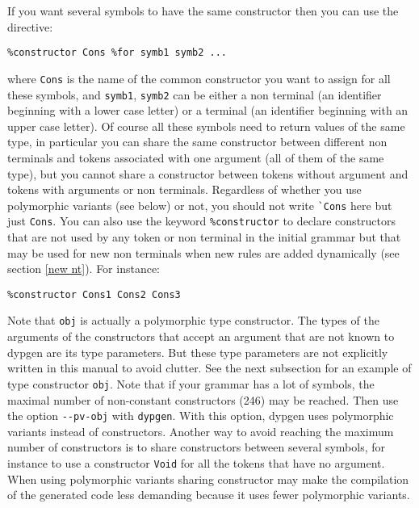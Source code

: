\documentclass[12pt]{article}
\begin{document}
{If you want several symbols to have the same constructor then you can use the directive:
\begin{verbatim}
%constructor Cons %for symb1 symb2 ...
\end{verbatim}
where \verb|Cons| is the name of the common constructor you want to assign for all these symbols, and \verb|symb1|, \verb|symb2| can be either a non terminal (an identifier beginning with a lower case letter) or a terminal (an identifier beginning with an upper case letter). Of course all these symbols need to return values of the same type, in particular you can share the same constructor between different non terminals and tokens associated with one argument (all of them of the same type), but you cannot share a constructor between tokens without argument and tokens with arguments or non terminals. Regardless of whether you use polymorphic variants (see below) or not, you should not write \verb|`Cons| here but just \verb|Cons|. You can also use the keyword \verb|%constructor| to declare constructors that are not used by any token or non terminal in the initial grammar but that may be used for new non terminals when new rules are added dynamically (see section \ref{new nt}). For instance:
\begin{verbatim}
%constructor Cons1 Cons2 Cons3
\end{verbatim}

Note that \texttt{obj} is actually a polymorphic type constructor. The types of the arguments of the constructors that accept an argument that are not known to dypgen are its type parameters. But these type parameters are not explicitly written in this manual to avoid clutter. See the next subsection for an example of type constructor \verb|obj|. Note that if your grammar has a lot of symbols, the maximal number of non-constant constructors (246) may be reached. Then use the option \verb|--pv-obj| with \verb|dypgen|. With this option, dypgen uses polymorphic variants instead of constructors. Another way to avoid reaching the maximum number of constructors is to share constructors between several symbols, for instance to use a constructor \verb|Void| for all the tokens that have no argument. When using polymorphic variants sharing constructor may make the compilation of the generated code less demanding because it uses fewer polymorphic variants.\\

}
\end{document}
